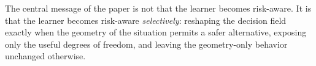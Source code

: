 The central message of the paper is not that the learner becomes
risk-aware. It is that the learner becomes risk-aware
\emph{selectively}: reshaping the decision field exactly when the
geometry of the situation permits a safer alternative, exposing only the
useful degrees of freedom, and leaving the geometry-only behavior unchanged otherwise.








